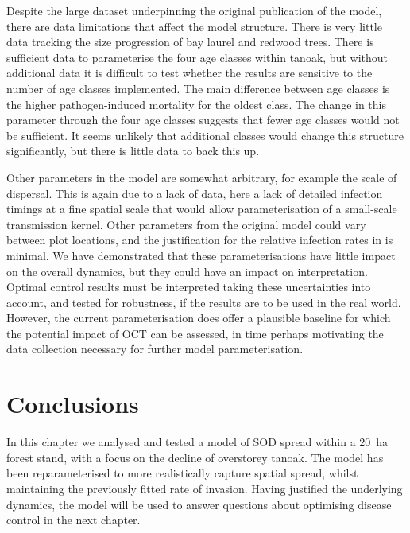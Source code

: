 Despite the large dataset underpinning the original publication of the model, there are data limitations that affect the model structure. There is very little data tracking the size progression of bay laurel and redwood trees. There is sufficient data to parameterise the four age classes within tanoak, but without additional data it is difficult to test whether the results are sensitive to the number of age classes implemented. The main difference between age classes is the higher pathogen-induced mortality for the oldest class. The change in this parameter through the four age classes suggests that fewer age classes would not be sufficient. It seems unlikely that additional classes would change this structure significantly, but there is little data to back this up.

Other parameters in the model are somewhat arbitrary, for example the scale of dispersal. This is again due to a lack of data, here a lack of detailed infection timings at a fine spatial scale that would allow parameterisation of a small-scale transmission kernel. Other parameters from the original model could vary between plot locations, and the justification for the relative infection rates in \citet{cobb_ecosystem_2012} is minimal. We have demonstrated that these parameterisations have little impact on the overall dynamics, but they could have an impact on interpretation. Optimal control results must be interpreted taking these uncertainties into account, and tested for robustness, if the results are to be used in the real world. However, the current parameterisation does offer a plausible baseline for which the potential impact of OCT can be assessed, in time perhaps motivating the data collection necessary for further model parameterisation.

\section{Conclusions\label{sec:ch5:conclusions}}

In this chapter we analysed and tested a model of SOD spread within a \SI{20}{\hectare} forest stand, with a focus on the decline of overstorey tanoak. The model has been reparameterised to more realistically capture spatial spread, whilst maintaining the previously fitted rate of invasion. Having justified the underlying dynamics, the model will be used to answer questions about optimising disease control in the next chapter.